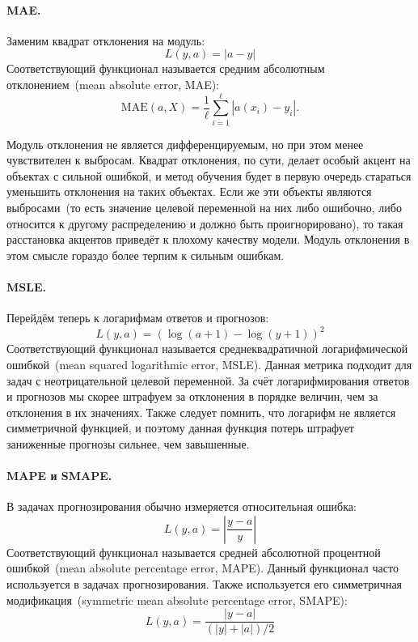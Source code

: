 \documentclass[12pt,fleqn]{article}
\begin{document}
\paragraph{MAE.}

Заменим квадрат отклонения на модуль:
$$
    L(y, a) = |a - y|
$$
Соответствующий функционал называется средним абсолютным отклонением~(mean absolute error, MAE):
$$
    \text{MAE}(a, X)
    =
    \frac{1}{\ell}
    \sum_{i = 1}^{\ell} \left|
        a(x_i) - y_i
    \right|.
$$

Модуль отклонения не является дифференцируемым, но при этом менее чувствителен к выбросам.
Квадрат отклонения, по сути, делает особый акцент на объектах с сильной ошибкой,
и метод обучения будет в первую очередь стараться уменьшить отклонения на таких объектах.
Если же эти объекты являются выбросами~(то есть значение целевой переменной на них либо ошибочно, либо относится к другому распределению и должно быть проигнорировано),
то такая расстановка акцентов приведёт к плохому качеству модели.
Модуль отклонения в этом смысле гораздо более терпим к сильным ошибкам.



\paragraph{MSLE.}

Перейдём теперь к логарифмам ответов и прогнозов:
$$
    L(y, a) = (\log(a + 1) - \log(y + 1))^2
$$
Соответствующий функционал называется среднеквадратичной логарифмической ошибкой~(mean
squared logarithmic error, MSLE).
Данная метрика подходит для задач с неотрицательной целевой переменной.
За счёт логарифмирования ответов и прогнозов мы скорее штрафуем за отклонения
в порядке величин, чем за отклонения в их значениях.
Также следует помнить, что логарифм не является симметричной функцией,
и поэтому данная функция потерь штрафует заниженные прогнозы сильнее,
чем завышенные.

\paragraph{MAPE и SMAPE.}

В задачах прогнозирования обычно измеряется относительная ошибка:
$$
    L(y, a) = \left| \frac{y - a}{y} \right|
$$
Соответствующий функционал называется средней абсолютной процентной ошибкой~(mean
absolute percentage error, MAPE).
Данный функционал часто используется в задачах прогнозирования.
Также используется его симметричная модификация~(symmetric mean absolute percentage error, SMAPE):
$$
    L(y, a) = \frac{|y - a|}{(|y| + |a|) / 2}
$$
\end{document}
